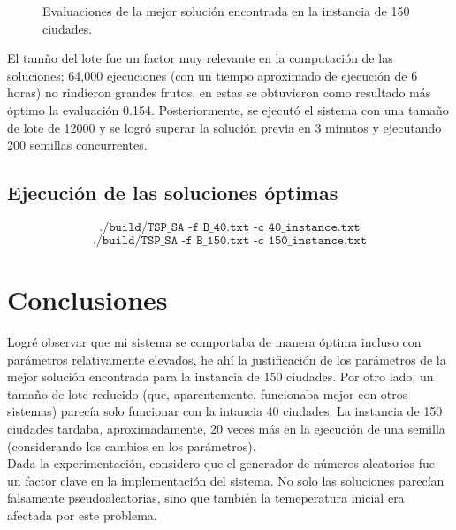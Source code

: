 \documentclass[a4paper]{report}
\begin{document}
\begin{figure}[h!tbp]
  \hspace*{-1.6cm}
  
  \caption{Evaluaciones de la mejor soluci\'on encontrada en la instancia de 150 ciudades.}
\end{figure}

El tam\~no del lote fue un factor muy relevante en la computaci\'on de las soluciones;
64,000 ejecuciones (con un tiempo aproximado de ejecuci\'on de 6 horas) no rindieron grandes
frutos, en estas se obtuvieron como resultado m\'as \'optimo la evaluaci\'on 0.154. Posteriormente,
se ejecut\'o el sistema con una tama\~no de lote de 12000 y se logr\'o superar la soluci\'on
previa en 3 minutos y ejecutando 200 semillas concurrentes.

\section{Ejecuci\'on de las soluciones \'optimas}

\[\texttt{./build/TSP\_SA -f B\_40.txt -c 40\_instance.txt}\]
\[\texttt{./build/TSP\_SA -f B\_150.txt -c 150\_instance.txt}\]

\chapter{Conclusiones}

Logr\'e observar que mi sistema se comportaba de manera \'optima incluso con par\'ametros
relativamente elevados, he ah\'i la justificaci\'on de los par\'ametros de la mejor soluci\'on encontrada
para la instancia de 150 ciudades. Por otro lado, un tama\~no de lote reducido (que,
aparentemente, funcionaba mejor con otros sistemas) parec\'ia solo funcionar con la intancia
40 ciudades. La instancia de 150 ciudades tardaba, aproximadamente, 20 veces m\'as en la ejecuci\'on
de una semilla (considerando los cambios en los par\'ametros).\\

Dada la experimentaci\'on, considero que el generador de n\'umeros aleatorios fue un factor
clave en la implementaci\'on del sistema. No solo las soluciones parec\'ian falsamente
pseudoaleatorias, sino que tambi\'en la temeperatura inicial era afectada por este problema.

{}

\end{document}
